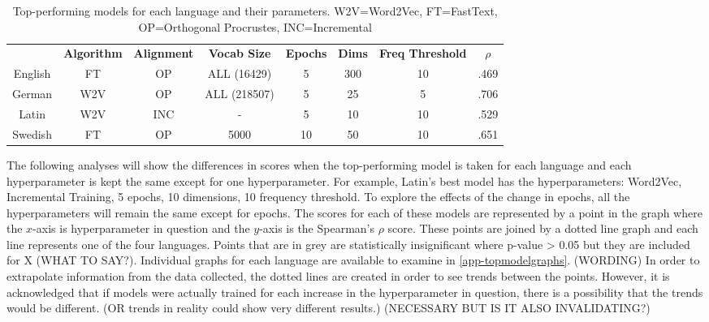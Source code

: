 \begin{table}[h]
\centering
\begin{tabular}{cccccccc} 
\toprule
\textbf{ } & \textbf{ Algorithm } & \textbf{ Alignment } & \textbf{ Vocab Size } & \textbf{ Epochs } & \textbf{ Dims } & \textbf{ Freq Threshold } & \textbf{ $\rho$ }  \\
English    & FT              & OP               & ALL (16429)      & 5                 & 300             & 10               & .469            \\
German     & W2V             & OP               & ALL (218507)     & 5                 & 25              & 5                & .706            \\
Latin      & W2V             & INC              & -                & 5                 & 10              & 10               & .529            \\
Swedish    & FT              & OP               & 5000             & 10                & 50              & 10               & .651            \\
\bottomrule
\end{tabular}
\caption{Top-performing models for each language and their parameters. W2V=Word2Vec, FT=FastText, OP=Orthogonal Procrustes, INC=Incremental}
\label{tab:top-models}
\end{table}

The following analyses will show the differences in scores when the top-performing model is taken for each language and each hyperparameter is kept the same except for one hyperparameter. For example, Latin’s best model has the hyperparameters: Word2Vec, Incremental Training, 5 epochs, 10 dimensions, 10 frequency threshold. To explore the effects of the change in epochs, all the hyperparameters will remain the same except for epochs. The scores for each of these models are represented by a point in the graph where the $x$-axis is hyperparameter in question and the $y$-axis is  the Spearman's $\rho$ score. These points are joined by a dotted line graph and each line represents one of the four languages. Points that are in grey are statistically insignificant where p-value > 0.05 but they are included for X (WHAT TO SAY?). Individual graphs for each language are available to examine in \autoref{app-topmodelgraphs}. (WORDING) In order to extrapolate information from the data collected, the dotted lines are created in order to see trends between the points. However, it is acknowledged that if models were actually trained for each increase in the hyperparameter in question, there is a possibility that the trends would be different. (OR trends in reality could show very different results.) (NECESSARY BUT IS IT ALSO INVALIDATING?)

